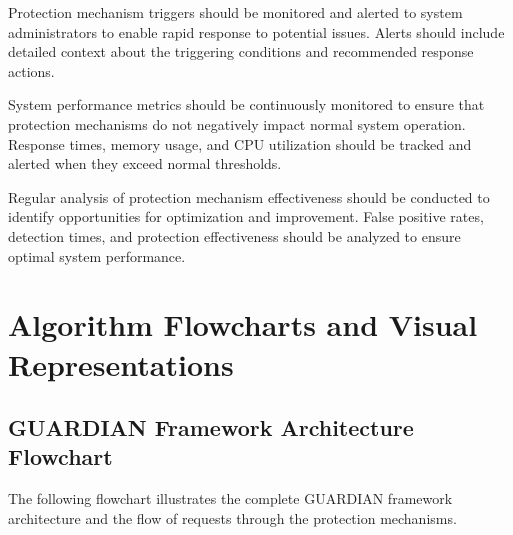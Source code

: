 \documentclass[10pt]{article}
\begin{document}
Protection mechanism triggers should be monitored and alerted to system administrators to enable rapid response to potential issues. Alerts should include detailed context about the triggering conditions and recommended response actions.

System performance metrics should be continuously monitored to ensure that protection mechanisms do not negatively impact normal system operation. Response times, memory usage, and CPU utilization should be tracked and alerted when they exceed normal thresholds.

Regular analysis of protection mechanism effectiveness should be conducted to identify opportunities for optimization and improvement. False positive rates, detection times, and protection effectiveness should be analyzed to ensure optimal system performance.

\section{Algorithm Flowcharts and Visual Representations}

\subsection{GUARDIAN Framework Architecture Flowchart}

The following flowchart illustrates the complete GUARDIAN framework architecture and the flow of requests through the protection mechanisms.
\end{document}
